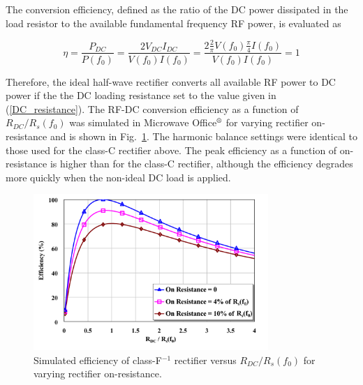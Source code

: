 The conversion efficiency, defined as the ratio of the DC power dissipated in the load resistor to the available fundamental frequency RF power, is evaluated as

\begin{equation}\label{eff_finv}
    \eta = \frac{P_{DC}}{P(f_0)} = \frac{2V_{DC}I_{DC}}{V(f_0)I(f_0)} = \frac{2\frac{2}{\pi}V(f_0)\frac{\pi}{4}I(f_0)}{V(f_0)I(f_0)} = 1
\end{equation}

Therefore, the ideal half-wave rectifier converts all available RF power to DC power if the the DC loading resistance set to the value given in (\ref{DC_resistance}). The RF-DC conversion efficiency as a function of $R_{DC} / R_s(f_0)$ was simulated in Microwave Office$\textsuperscript{\textregistered}$ for varying rectifier on-resistance and is shown in Fig.~\ref{sim_opt_eff_classFinv}. The harmonic balance settings were identical to those used for the class-C rectifier above. The peak efficiency as a function of on-resistance is higher than for the class-C rectifier, although the efficiency degrades more quickly when the non-ideal DC load is applied.

%

\begin{figure}[!b]
  \begin{center}
  \includegraphics[width=3.5in]{pdf/04.pdf}
  \caption{Simulated efficiency of class-F$^{-1}$ rectifier versus $R_{DC} / R_s(f_0)$ for varying rectifier on-resistance.}\label{sim_opt_eff_classFinv}
  \end{center}
\end{figure}

